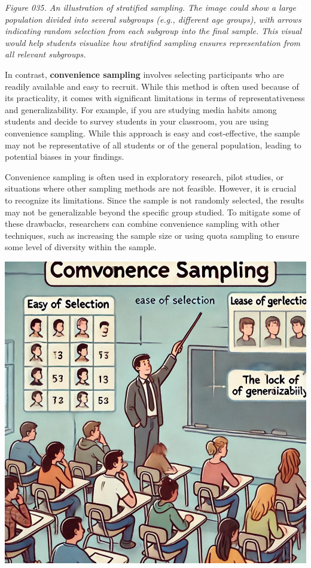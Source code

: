 \documentclass[
]{book}
\begin{document}
\emph{Figure 035. An illustration of stratified sampling. The image could show a large population divided into several subgroups (e.g., different age groups), with arrows indicating random selection from each subgroup into the final sample. This visual would help students visualize how stratified sampling ensures representation from all relevant subgroups.}

In contrast, \textbf{convenience sampling} involves selecting participants who are readily available and easy to recruit. While this method is often used because of its practicality, it comes with significant limitations in terms of representativeness and generalizability. For example, if you are studying media habits among students and decide to survey students in your classroom, you are using convenience sampling. While this approach is easy and cost-effective, the sample may not be representative of all students or of the general population, leading to potential biases in your findings.

Convenience sampling is often used in exploratory research, pilot studies, or situations where other sampling methods are not feasible. However, it is crucial to recognize its limitations. Since the sample is not randomly selected, the results may not be generalizable beyond the specific group studied. To mitigate some of these drawbacks, researchers can combine convenience sampling with other techniques, such as increasing the sample size or using quota sampling to ensure some level of diversity within the sample.

\includegraphics[width=1\linewidth,height=\textheight,keepaspectratio]{images/fig036.jpg}
\end{document}
